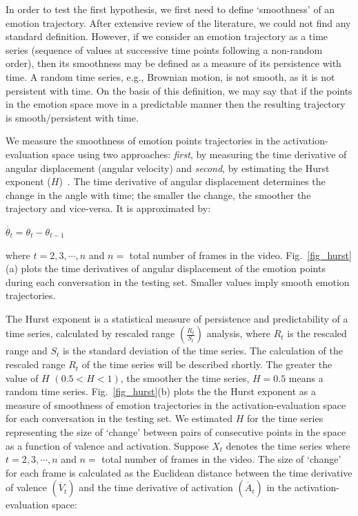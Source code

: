 \documentclass[10pt,journal,cspaper,compsoc]{IEEEtran}
\begin{document}
In order to test the first hypothesis,  we first need to define `smoothness' of an emotion trajectory. After extensive review of the literature, we could not find any standard definition. However, if we consider an emotion trajectory as a time series (sequence of values at successive time points following a non-random order), then its smoothness may be defined as a measure of its persistence with time. A random time series, e.g., Brownian motion, is not smooth, as it is not persistent with time. On the basis of this definition, we may say that if the points in the emotion space move in a predictable manner then the resulting trajectory is smooth/persistent with time.

We measure the smoothness of emotion points trajectories in the activation-evaluation space using two approaches: \emph{first}, by measuring the time derivative of angular displacement (angular velocity) and \emph{second}, by estimating the Hurst exponent ($H$)~\cite{qian2004hurst}. The time derivative of angular displacement determines the change in the angle with time; the smaller the change, the smoother the trajectory and vice-versa. It is approximated by:

\begin{center}
$\dot{\theta_{t}}=\theta_{t}-\theta_{t-1}$  \\
\end{center}

\noindent where $t=2,3,\cdots,n$ and $n=$ total number of frames in the video. Fig.~\ref{fig_hurst}(a) plots the time derivatives of angular displacement of the emotion points during each conversation in the testing set. Smaller values imply smooth emotion trajectories.

The Hurst exponent is a statistical measure of persistence and predictability of a time series, calculated by rescaled range $\left(\frac{R_{t}}{S_{t}}\right)$ analysis, where $R_{t}$ is the rescaled range and $S_{t}$ is the standard deviation of the time series. The calculation of the rescaled range $R_{t}$ of the time series will be described shortly. The greater the value of $H$ $(0.5<H<1)$, the smoother the time series, $H=0.5$ means a random time series. Fig.~\ref{fig_hurst}(b) plots the the Hurst exponent as a measure of smoothness of emotion trajectories in the activation-evaluation space for each conversation in the testing set. We estimated $H$ for the time series representing the size of `change' between pairs of consecutive points in the space as a function of valence and activation. Suppose $X_{t}$ denotes the time series where $t=2,3,\cdots,n$ and $n=$ total number of frames in the video. The size of `change' for each frame is calculated as the Euclidean distance between the time derivative of valence $(\dot{V_{t}})$ and the time derivative of activation $(\dot{A_{t}})$ in the activation-evaluation space:
\end{document}
